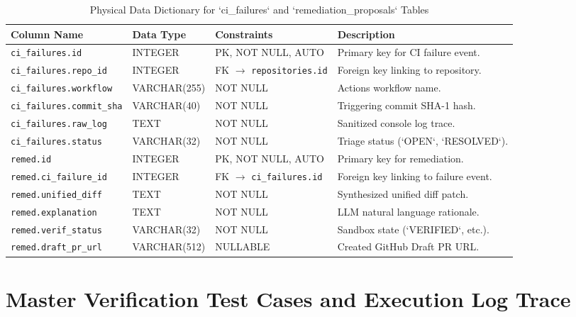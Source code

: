 \documentclass[12pt,a4paper,oneside]{report}
\begin{document}
\begin{table}[htbp]
    \centering
    \caption{Physical Data Dictionary for `ci\_failures` and `remediation\_proposals` Tables}
    \label{tab:app-dict-ci}
    \small
    \begin{tabularx}{\textwidth}{p{} p{} p{} p{}}
        \toprule
        \textbf{Column Name} & \textbf{Data Type} & \textbf{Constraints} & \textbf{Description} \\
        \midrule
        \texttt{ci\_failures.id} & INTEGER & PK, NOT NULL, AUTO & Primary key for CI failure event. \\
        \texttt{ci\_failures.repo\_id} & INTEGER & FK $\to$ \texttt{repositories.id} & Foreign key linking to repository. \\
        \texttt{ci\_failures.workflow} & VARCHAR(255) & NOT NULL & Actions workflow name. \\
        \texttt{ci\_failures.commit\_sha} & VARCHAR(40) & NOT NULL & Triggering commit SHA-1 hash. \\
        \texttt{ci\_failures.raw\_log} & TEXT & NOT NULL & Sanitized console log trace. \\
        \texttt{ci\_failures.status} & VARCHAR(32) & NOT NULL & Triage status (`OPEN`, `RESOLVED`). \\
        \midrule
        \texttt{remed.id} & INTEGER & PK, NOT NULL, AUTO & Primary key for remediation. \\
        \texttt{remed.ci\_failure\_id} & INTEGER & FK $\to$ \texttt{ci\_failures.id} & Foreign key linking to failure event. \\
        \texttt{remed.unified\_diff} & TEXT & NOT NULL & Synthesized unified diff patch. \\
        \texttt{remed.explanation} & TEXT & NOT NULL & LLM natural language rationale. \\
        \texttt{remed.verif\_status} & VARCHAR(32) & NOT NULL & Sandbox state (`VERIFIED`, etc.). \\
        \texttt{remed.draft\_pr\_url} & VARCHAR(512) & NULLABLE & Created GitHub Draft PR URL. \\
        \bottomrule
    \end{tabularx}
\end{table}

\cleardoublepage

\chapter{Master Verification Test Cases and Execution Log Trace}
\label{app:test-cases}
\end{document}
